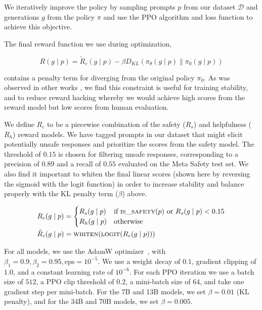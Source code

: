 \documentclass{article}
\begin{document}
We iteratively improve the policy by sampling prompts $p$ from our dataset $\mathcal{D}$ and generations $g$ from the policy $\pi$ and use the PPO algorithm and loss function to achieve this objective.

The final reward function we use during optimization,

\begin{equation}
   R(g \mid p) = \tilde{R}_{c}(g \mid p) - \beta D_{KL}(\pi_{\theta}(g \mid p) \parallel \pi_{0}(g \mid p))
\end{equation}

contains a penalty term for diverging from the original policy $\pi_{0}$. As was observed in other works \citep{stienon2020learning, ouyang2022training}, we find this constraint is useful for training stability, and to reduce reward hacking whereby we would achieve high scores from the reward model but low scores from human evaluation.

We define $R_c$ to be a piecewise combination of the safety ($R_s$) and helpfulness ($R_h$) reward models. We have tagged prompts in our dataset that might elicit potentially unsafe responses and prioritize the scores from the safety model. The threshold of $0.15$ is chosen for filtering unsafe responses, corresponding to a precision of $0.89$ and a recall of $0.55$ evaluated on the Meta Safety test set. We also find it important to whiten the final linear scores (shown here by reversing the sigmoid with the logit function) in order to increase stability and balance properly with the KL penalty term ($\beta$) above.

\begin{align*}
R_c(g \mid p) &= 
    \begin{cases} 
        R_s(g \mid p) & \text{if } \textsc{is\_safety}(p) \text{ or } R_s(g \mid p) < 0.15 \\
        R_h(g \mid p) & \text{otherwise}
    \end{cases} \\
\tilde{R}_c(g \mid p) &= \textsc{whiten}(\textsc{logit}(R_c(g \mid p)))
\end{align*}

For all models, we use the AdamW optimizer~\citep{loshchilov2017decoupled}, with $\beta_1 = 0.9, \beta_2 = 0.95, \text{eps} = 10^{-5}$.
We use a weight decay of $0.1$, gradient clipping of $1.0$, and a constant learning rate of $10^{-6}$.
For each PPO iteration we use a batch size of $512$, a PPO clip threshold of $0.2$, a mini-batch size of $64$, and take one gradient step per mini-batch.
For the 7B and 13B models, we set $\beta = 0.01$ (KL penalty), and for the 34B and 70B models, we set $\beta = 0.005$.
\end{document}
